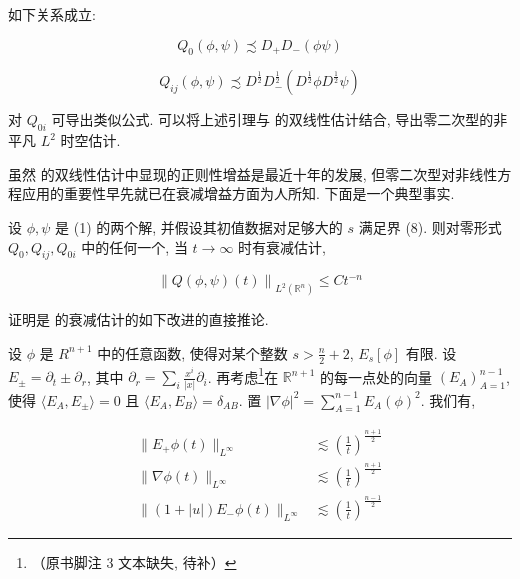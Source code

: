\begin{lemma}[见 {[}44{]} 及其参考文献]\label{lem:cG-1.19}
如下关系成立:

\begin{equation}
Q _ {0} (\phi ,  \psi) \precsim D _ {+} D _ {-} (\phi \psi)\label{eq:cG-17}
\end{equation}

\begin{equation}
Q _ {i j} (\phi ,  \psi) \precsim D ^ {\frac {1}{2}} D _ {-} ^ {\frac {1}{2}} (D ^ {\frac {1}{2}} \phi D ^ {\frac {1}{2}} \psi)\label{eq:cG-18}
\end{equation}
\end{lemma}

\begin{remark}\label{rem:cG-1.20}
对 $Q_{0i}$ 可导出类似公式. 可以将上述引理与 的双线性估计结合, 导出零二次型的非平凡 $L^{2}$ 时空估计. 
\end{remark}

\begin{remark}\label{rem:cG-1.21}
虽然 的双线性估计中显现的正则性增益是最近十年的发展, 但零二次型对非线性方程应用的重要性早先就已在衰减增益方面为人所知. 下面是一个典型事实. 
\end{remark}

\begin{proposition}[零形式的衰减{[}28{]}]\label{prop:cG-1.22}
设 $\phi,  \psi$ 是 (1) 的两个解, 并假设其初值数据对足够大的 $s$ 满足界 (8). 则对零形式 $Q_0,  Q_{ij},  Q_{0i}$ 中的任何一个, 当 $t\to \infty$ 时有衰减估计, 

\begin{equation}
\left\| Q (\phi ,  \psi) (t) \right\| _ {L ^ {2} \left(\mathbb {R} ^ {n}\right)} \leq C t ^ {- n}\label{eq:cG-19}
\end{equation}
\end{proposition}

证明是 的衰减估计的如下改进的直接推论. 

\begin{proposition}[剥离衰减性质]\label{prop:cG-1.23}
设 $\phi$ 是 $R^{n + 1}$ 中的任意函数, 使得对某个整数 $s > \frac{n}{2} +2$, $E_{s}[\phi]$ 有限. 设 $E_{\pm} = \partial_t \pm \partial_r$, 其中 $\partial_r = \sum_i\frac{x^i}{|x|}\partial_i$. 再考虑\footnote{（原书脚注 3 文本缺失, 待补）}在 $\mathbb{R}^{n + 1}$ 的每一点处的向量 $(E_A)_{A = 1}^{n - 1}$, 使得 $\langle E_A,  E_\pm \rangle = 0$ 且 $\langle E_A, E_B \rangle = \delta_{AB}$. 置 $|\nabla \phi |^2 = \sum_{A = 1}^{n - 1}E_A(\phi)^2$. 我们有, 

\[
\begin{aligned}
\| E _ {+} \phi (t) \| _ {L ^ {\infty}} &\lesssim \left(\frac {1}{t}\right) ^ {\frac {n + 1}{2}} \\
\| \nabla \phi (t) \| _ {L ^ {\infty}} &\lesssim \left(\frac {1}{t}\right) ^ {\frac {n + 1}{2}} \\
\| (1 + | u |) E _ {-} \phi (t) \| _ {L ^ {\infty}} &\lesssim \left(\frac {1}{t}\right) ^ {\frac {n - 1}{2}}
\end{aligned}
\]
\end{proposition}

